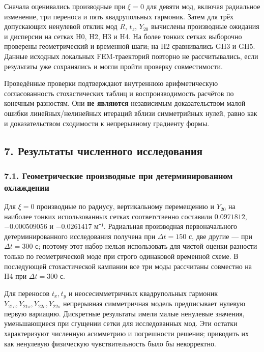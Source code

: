 \documentclass[
]{article}
\begin{document}
Сначала оценивались производные при \(\xi=0\) для девяти мод, включая
радиальное изменение, три переноса и пять квадрупольных гармоник. Затем
для трёх допускающих ненулевой отклик мод \(R\), \(t_z\), \(Y_{20}\)
вычислены производные ожидания и дисперсии на сетках H0, H2, H3 и H4. На
более тонких сетках выборочно проверены геометрический и временной шаги;
на H2 сравнивались GH3 и GH5. Данные исходных локальных FEM-траекторий
повторно не рассчитывались, если результаты уже сохранялись и могли
пройти проверку совместимости.

Проведённые проверки подтверждают внутреннюю арифметическую
согласованность стохастических таблиц и воспроизводимость расчётов по
конечным разностям. Они \textbf{не являются} независимым доказательством
малой ошибки линейных/нелинейных итераций вблизи симметрийных нулей,
равно как и доказательством сходимости к непрерывному градиенту формы.

\subsection{7. Результаты численного
исследования}\label{ux440ux435ux437ux443ux43bux44cux442ux430ux442ux44b-ux447ux438ux441ux43bux435ux43dux43dux43eux433ux43e-ux438ux441ux441ux43bux435ux434ux43eux432ux430ux43dux438ux44f}

\subsubsection{7.1. Геометрические производные при детерминированном
охлаждении}\label{ux433ux435ux43eux43cux435ux442ux440ux438ux447ux435ux441ux43aux438ux435-ux43fux440ux43eux438ux437ux432ux43eux434ux43dux44bux435-ux43fux440ux438-ux434ux435ux442ux435ux440ux43cux438ux43dux438ux440ux43eux432ux430ux43dux43dux43eux43c-ux43eux445ux43bux430ux436ux434ux435ux43dux438ux438}

Для \(\xi=0\) производные по радиусу, вертикальному перемещению и
\(Y_{20}\) на наиболее тонких использованных сетках соответственно
составили \(0.0971812\), \(-0.000509056\) и \(-0.0261417\) м⁻¹.
Радиальная производная первоначального детерминированного исследования
получена при \(\Delta t=150\) с, две другие --- при \(\Delta t=300\) с;
поэтому этот набор нельзя использовать для чистой оценки разности только
по геометрической моде при строго одинаковой временной схеме. В
последующей стохастической кампании все три моды рассчитаны совместно на
H4 при \(\Delta t=300\) с.

Для переносов \(t_x,t_y\) и неосесимметричных квадрупольных гармоник
\(Y_{21c},Y_{21s},Y_{22c},Y_{22s}\) непрерывная симметричная модель
предписывает нулевую первую вариацию. Дискретные результаты имели малые
ненулевые значения, уменьшающиеся при сгущении сетки для исследованных
мод. Эти остатки характеризуют численную асимметрию и погрешности
решения; приводить их как ненулевую физическую чувствительность было бы
некорректно.
\end{document}
